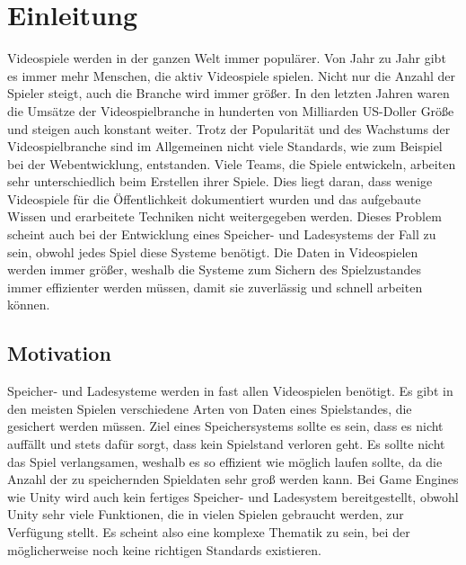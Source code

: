 \chapter{Einleitung}\label{ch:introduction}
Videospiele werden in der ganzen Welt immer populärer. Von Jahr zu Jahr gibt es immer mehr Menschen, die aktiv Videospiele spielen.\cite{explodingtopicsManyGamers} Nicht nur die Anzahl der Spieler steigt, auch die Branche wird immer größer. In den letzten Jahren waren die Umsätze der Videospielbranche in hunderten von Milliarden US-Doller Größe und steigen auch konstant weiter.\cite{statistaUmsatzVideogames} Trotz der Popularität und des Wachstums der Videospielbranche sind im Allgemeinen nicht viele Standards, wie zum Beispiel bei der Webentwicklung, entstanden. Viele Teams, die Spiele entwickeln, arbeiten sehr unterschiedlich beim Erstellen ihrer Spiele. Dies liegt daran, dass wenige Videospiele für die Öffentlichkeit dokumentiert wurden und das aufgebaute Wissen und erarbeitete Techniken nicht weitergegeben werden. Dieses Problem scheint auch bei der Entwicklung eines Speicher- und Ladesystems der Fall zu sein, obwohl jedes Spiel diese Systeme benötigt. Die Daten in Videospielen werden immer größer, weshalb die Systeme zum Sichern des Spielzustandes immer effizienter werden müssen, damit sie zuverlässig und schnell arbeiten können.

\section{Motivation}
Speicher- und Ladesysteme werden in fast allen Videospielen benötigt. Es gibt in den meisten Spielen verschiedene Arten von Daten eines Spielstandes, die gesichert werden müssen. Ziel eines Speichersystems sollte es sein, dass es nicht auffällt und stets dafür sorgt, dass kein Spielstand verloren geht. Es sollte nicht das Spiel verlangsamen, weshalb es so effizient wie möglich laufen sollte, da die Anzahl der zu speichernden Spieldaten sehr groß werden kann. Bei Game Engines wie Unity wird auch kein fertiges Speicher- und Ladesystem bereitgestellt, obwohl Unity sehr viele Funktionen, die in vielen Spielen gebraucht werden, zur Verfügung stellt. Es scheint also eine komplexe Thematik zu sein, bei der möglicherweise noch keine richtigen Standards existieren. 

